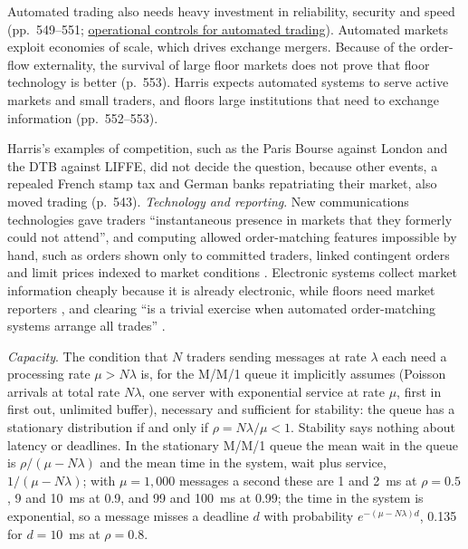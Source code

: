 \begin{qfdefinition}
 Automated trading also needs heavy investment in reliability, security and speed (pp.~549--551; \hyperref[meth:automated-trading-operational-controls]{operational controls for automated trading}). Automated markets exploit economies of scale, which drives exchange mergers. Because of the order-flow externality, the survival of large floor markets does not prove that floor technology is better (p.~553). Harris expects automated systems to serve active markets and small traders, and floors large institutions that need to exchange information (pp.~552--553).

 Harris's examples of competition, such as the Paris Bourse against London and the DTB against LIFFE, did not decide the question, because other events, a repealed French stamp tax and German banks repatriating their market, also moved trading (p.~543). \emph{Technology and reporting}. New communications technologies gave traders ``instantaneous presence in markets that they formerly could not attend'', and computing allowed order-matching features impossible by hand, such as orders shown only to committed traders, linked contingent orders and limit prices indexed to market conditions \citep[chap.~``Competition Within and Among Markets'', sec.~26.1, pp.~524--525]{alpha-harris}. Electronic systems collect market information cheaply because it is already electronic, while floors need market reporters \citep[chap.~5, sec.~5.4.1, p.~97]{alpha-harris}, and clearing ``is a trivial exercise when automated order-matching systems arrange all trades'' \citep[chap.~3, sec.~3.2.2.1, p.~35]{alpha-harris}.

\emph{Capacity}. The condition that $N$ traders sending messages at rate $\lambda$ each need a processing rate $\mu>N\lambda$ is, for the M/M/1 queue it implicitly assumes (Poisson arrivals at total rate $N\lambda$, one server with exponential service at rate $\mu$, first in first out, unlimited buffer), necessary and sufficient for stability: the queue has a stationary distribution if and only if $\rho=N\lambda/\mu<1$. Stability says nothing about latency or deadlines. In the stationary M/M/1 queue the mean wait in the queue is $\rho/(\mu-N\lambda)$ and the mean time in the system, wait plus service, $1/(\mu-N\lambda)$; with $\mu=1{,}000$ messages a second these are 1 and 2~ms at $\rho=0.5$, 9 and 10~ms at 0.9, and 99 and 100~ms at 0.99; the time in the system is exponential, so a message misses a deadline $d$ with probability $e^{-(\mu-N\lambda)d}$, 0.135 for $d=10$~ms at $\rho=0.8$.


\end{qfdefinition}
